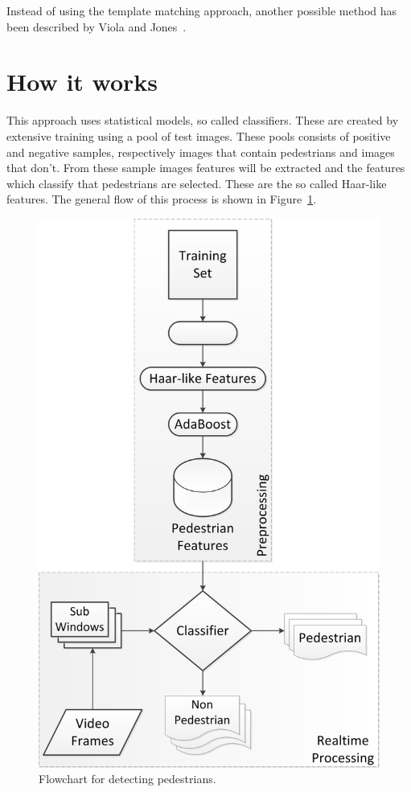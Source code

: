 \documentclass{article}
\begin{document}
Instead of using the template matching approach, another possible method has been described by Viola and Jones~\cite{viola2001rapid}.

\section{How it works}
This approach uses statistical models, so called classifiers. These are created by extensive training using a pool of test images. These pools consists of positive and negative samples, respectively images that contain pedestrians and images that don't. 
From these sample images features will be extracted and the features which classify that pedestrians are selected. These are the so called Haar-like features. The general flow of this process is shown in Figure~\ref{fig:flowchart}.

\begin{figure}[h!]
	\centering
	\includegraphics[scale=0.5]{HaarTrainingFlowChart.png}
	\caption{Flowchart for detecting pedestrians.}
	\label{fig:flowchart}
\end{figure}
\end{document}
